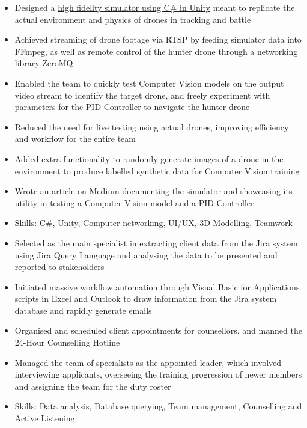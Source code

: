 \documentclass{cv}
\begin{document}
\begin{subsections}
    \subtitle{Command, Control and Communications Development, Defence Science and Technology Agency}
    \item{}
    \begin{itemize}
        \item Designed a \href{https://github.com/thedylone/unity-drone-simulator}{high fidelity simulator using C\# in Unity} meant to replicate the actual environment and physics of drones in tracking and battle
        \item Achieved streaming of drone footage via RTSP by feeding simulator data into FFmpeg, as well as remote control of the hunter drone through a networking library ZeroMQ
        \item Enabled the team to quickly test Computer Vision models on the output video stream to identify the target drone, and freely experiment with parameters for the PID Controller to navigate the hunter drone
        \item Reduced the need for live testing using actual drones, improving efficiency and workflow for the entire team
        \item Added extra functionality to randomly generate images of a drone in the environment to produce labelled synthetic data for Computer Vision training
        \item Wrote an \href{https://medium.com/d-classified/unity-as-a-testbed-for-autonomy-development-1e326323c68d}{article on Medium} documenting the simulator and showcasing its utility in testing a Computer Vision model and a PID Controller
        \item Skills: C\#, Unity, Computer networking, UI/UX, 3D Modelling, Teamwork
    \end{itemize}

    \subtitle{SAF Counselling Centre}
    \item{}
    \begin{itemize}
        \item Selected as the main specialist in extracting client data from the Jira system using Jira Query Language and analysing the data to be presented and reported to stakeholders
        \item Initiated massive workflow automation through Visual Basic for Applications scripts in Excel and Outlook to draw information from the Jira system database and rapidly generate emails 
        \item Organised and scheduled client appointments for counsellors, and manned the 24-Hour Counselling Hotline
        \item Managed the team of specialists as the appointed leader, which involved interviewing applicants, overseeing the training progression of newer members and assigning the team for the duty roster
        \item Skills: Data analysis, Database querying, Team management, Counselling and Active Listening
    \end{itemize}
\end{subsections}
\end{document}

